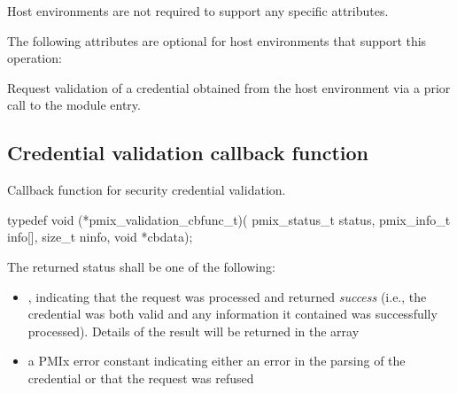 
\divider

Host environments are not required to support any specific attributes.

\reqattrend

\optattrstart
The following attributes are optional for host environments that support this operation:


\optattrend

\descr

Request validation of a credential obtained from the host environment via a prior call to the  module entry.


\subsection{Credential validation callback function}

\summary

Callback function for security credential validation.

\format

\cspecificstart
\begin{codepar}
typedef void (*pmix_validation_cbfunc_t)(
                    pmix_status_t status,
                    pmix_info_t info[], size_t ninfo,
                    void *cbdata);
\end{codepar}
\cspecificend

\begin{arglist}
\end{arglist}

The returned status shall be one of the following:

\begin{itemize}
    \item {}, indicating that the request was processed and returned \textit{success} (i.e., the credential was both valid and any information it contained was successfully processed). Details of the result will be returned in the  array
    \item a PMIx error constant indicating either an error in the parsing of the credential or that the request was refused
\end{itemize}

